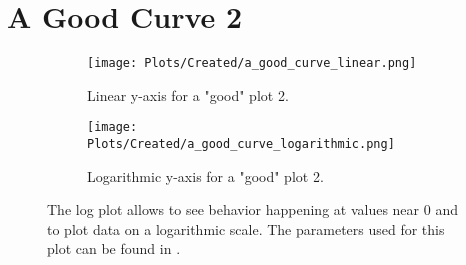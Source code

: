 \section{A Good Curve 2}
\label{sec:appendixE:a_good_curve_2}

\begin{figure}[h!]
    \centering
    \begin{subfigure}{1\linewidth}
        \centering
        \captionsetup{width=1\linewidth}
        \texttt{[image: Plots/Created/a\_good\_curve\_linear.png]}
        \caption{
            Linear y-axis for a "good" plot 2. 
        }
        \label{fig:created:a_good_curve_linear_2}
    \end{subfigure}
    \hfill
    \begin{subfigure}{1\linewidth}
        \centering
        \captionsetup{width=1\linewidth}
        \texttt{[image: Plots/Created/a\_good\_curve\_logarithmic.png]}
        \caption{
            Logarithmic y-axis for a "good" plot 2. 
        }
        \label{fig:created:a_good_curve_logarithmic_2}
    \end{subfigure}
    \caption{
        The log plot allows to see behavior happening at values near 0 and to plot data on a logarithmic scale. 
        The parameters used for this plot can be found in . 
    }
    \label{fig:created:a_good_curve_2}
\end{figure}

